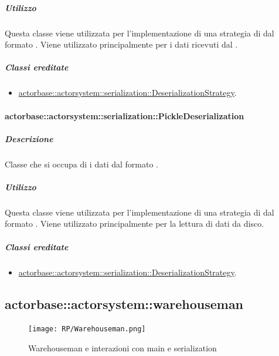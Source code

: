 \documentclass{scalatekids-article}
\begin{document}
\subparagraph{Utilizzo}

Questa classe viene utilizzata per l'implementazione di una strategia di
 dal formato . Viene utilizzato
principalmente per i dati ricevuti dal .

\subparagraph{Classi ereditate}

\begin{itemize}

\item \hyperref[sec:actorbase::actorsystem::serialization::DeserializationStrategy]{actorbase::actorsystem::serialization::DeserializationStrategy}.

\end{itemize}

\paragraph{actorbase::actorsystem::serialization::PickleDeserialization}
\label{sec:actorbase::actorsystem::serialization::PickleDeserialization}

\subparagraph{Descrizione}

Classe che si occupa di  i dati dal formato .

\subparagraph{Utilizzo}

Questa classe viene utilizzata per l'implementazione di una strategia di
 dal formato . Viene utilizzato
principalmente per la lettura di dati da disco.

\subparagraph{Classi ereditate}

\begin{itemize}

\item \hyperref[sec:actorbase::actorsystem::serialization::DeserializationStrategy]{actorbase::actorsystem::serialization::DeserializationStrategy}.

\end{itemize}

\subsection{actorbase::actorsystem::warehouseman}
\label{sec:actorbase::actorsystem::warehouseman}

\begin{figure}[H]
  \begin{center}
    \texttt{[image: RP/Warehouseman.png]}
    \caption{Warehouseman e interazioni con main e serialization}
  \end{center}
\end{figure}
\end{document}
